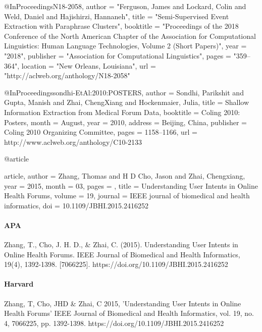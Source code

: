 \documentclass[11pt]{article}
\begin{document}
@InProceedings{N18-2058,
  author = 	"Ferguson, James
		and Lockard, Colin
		and Weld, Daniel
		and Hajishirzi, Hannaneh",
  title = 	"Semi-Supervised Event Extraction with Paraphrase Clusters",
  booktitle = 	"Proceedings of the 2018 Conference of the North American Chapter of the Association for Computational Linguistics: Human Language Technologies, Volume 2 (Short Papers)",
  year = 	"2018",
  publisher = 	"Association for Computational Linguistics",
  pages = 	"359--364",
  location = 	"New Orleans, Louisiana",
  url = 	"http://aclweb.org/anthology/N18-2058"
}

@InProceedings{sondhi-EtAl:2010:POSTERS,
  author    = {Sondhi, Parikshit  and  Gupta, Manish  and  Zhai, ChengXiang  and  Hockenmaier, Julia},
  title     = {Shallow Information Extraction from Medical Forum Data},
  booktitle = {Coling 2010: Posters},
  month     = {August},
  year      = {2010},
  address   = {Beijing, China},
  publisher = {Coling 2010 Organizing Committee},
  pages     = {1158--1166},
  url       = {http://www.aclweb.org/anthology/C10-2133}
}


@article{article,
author = {Zhang, Thomas and H D Cho, Jason and Zhai, Chengxiang},
year = {2015},
month = {03},
pages = {},
title = {Understanding User Intents in Online Health Forums},
volume = {19},
journal = {IEEE journal of biomedical and health informatics},
doi = {10.1109/JBHI.2015.2416252}

}

\paragraph{APA}

Zhang, T., Cho, J. H. D., \& Zhai, C. (2015). Understanding User Intents in Online Health Forums. IEEE Journal of Biomedical and Health Informatics, 19(4), 1392-1398. [7066225]. https://doi.org/10.1109/JBHI.2015.2416252

\paragraph{Harvard}

Zhang, T, Cho, JHD \& Zhai, C 2015, 'Understanding User Intents in Online Health Forums' IEEE Journal of Biomedical and Health Informatics, vol. 19, no. 4, 7066225, pp. 1392-1398. https://doi.org/10.1109/JBHI.2015.2416252
\end{document}
